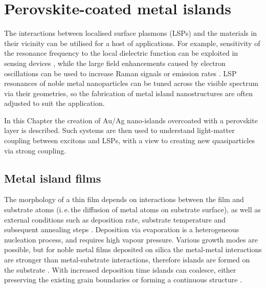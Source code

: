 
\chapter{Perovskite-coated metal islands}

\graphicspath{{Chapter6/Figures/}}

The interactions between localised surface plasmons (LSPs) and the materials in their vicinity can be utilised for a host of applications. For example, sensitivity of the resonance frequency to the local dielectric function can be exploited in sensing devices \cite{Jensen2000, Xu2004, Malinsky2001, Royer1987}, while the large field enhancements caused by electron oscillations can be used to increase Raman signals \cite{Cade2009, Olson2001, Talley2005} or emission rates \cite{Toftegaard2011, Cho2010, Reboud2013, Blanco2004}. LSP resonances of noble metal nanoparticles can be tuned across the visible spectrum via their geometries, so the fabrication of metal island nanostructures are often adjusted to suit the application.

In this Chapter the creation of Au/Ag nano-islands overcoated with a perovskite layer is described. Such systems are then used to understand light-matter coupling between excitons and LSPs, with a view to creating new quasiparticles via strong coupling.

\section{Metal island films}
The morphology of a thin film depends on interactions between the film and substrate atoms (i.\,e.\,the diffusion of metal atoms on substrate surface), as well as external conditions such as deposition rate, substrate temperature and subsequent annealing steps \cite{Kaiser2002}. Deposition via evaporation is a heterogeneous nucleation process, and requires high vapour pressure. Various growth modes are possible, but for noble metal films deposited on silica the metal-metal interactions are stronger than metal-substrate interactions, therefore islands are formed on the substrate \cite{Kaiser2002}. With increased deposition time islands can coalesce, either preserving the existing grain boundaries or forming a continuous structure \cite{Sennett1950,Gupta2002}.

